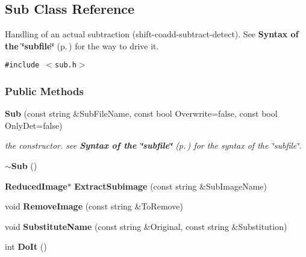 \subsection{Sub  Class Reference}
\label{class_sub}
Handling of an actual subtraction (shift-coadd-subtract-detect). See {\bf Syntax of the \char`\"{}subfile\char`\"{}} {\rm (p.\,\pageref{subfile})} for the way to drive it. 


{\tt \#include $<$sub.h$>$}

\subsubsection*{Public Methods}
\begin{CompactItemize}
\item 
{}
{\bf Sub} (const string \&Sub\-File\-Name, const bool Overwrite=false, const bool Only\-Det=false)\label{class_sub_a0}

\begin{CompactList}\small\item\em the constructor. see {\bf Syntax of the \char`\"{}subfile\char`\"{}} {\rm (p.\,\pageref{subfile})} for the syntax of the \char`\"{}subfile\char`\"{}.\item\end{CompactList}\item 
{}
{\bf $\sim$Sub} ()\label{class_sub_a1}

\item 
{}
{\bf Reduced\-Image}$\ast$ {\bf Extract\-Subimage} (const string \&Sub\-Image\-Name)\label{class_sub_a2}

\item 
{}
void {\bf Remove\-Image} (const string \&To\-Remove)\label{class_sub_a3}

\item 
{}
void {\bf Substitute\-Name} (const string \&Original, const string \&Substitution)\label{class_sub_a4}

\item 
{}
int {\bf Do\-It} ()\label{class_sub_a5}


\end{CompactItemize}
